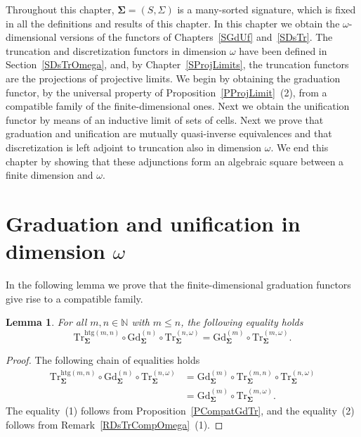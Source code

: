 \documentclass[a4paper, reqno]{amsbook}
\newcommand{\sig}[1]{\mathbf{#1}}             %
\newcommand{\htg}{\mathrm{htg}}                %
\newcommand{\Gd}{\mathrm{Gd}}
\newcommand{\Tr}{\mathrm{Tr}}
\theoremstyle{plain}
\newtheorem{lemma}[theorem]{Lemma}
\theoremstyle{definition}
\begin{document}
Throughout this chapter, $\sig{\Sigma}=(S,\Sigma)$ is a many-sorted signature, which is fixed in all the definitions and results of this chapter.
In this chapter we obtain the $\omega$-dimensional versions of the functors of Chapters~\ref{SGdUf} and~\ref{SDsTr}.
The truncation and discretization functors in dimension $\omega$ have been defined in Section~\ref{SDsTrOmega}, and, by Chapter~\ref{SProjLimits}, the truncation functors are the projections of projective limits.
We begin by obtaining the graduation functor, by the universal property of Proposition~\ref{PProjLimit}~(2), from a compatible family of the finite-dimensional ones.
Next we obtain the unification functor by means of an inductive limit of sets of cells.
Next we prove that graduation and unification are mutually quasi-inverse equivalences and that discretization is left adjoint to truncation also in dimension $\omega$.
We end this chapter by showing that these adjunctions form an algebraic square between a finite dimension and $\omega$.

\section{Graduation and unification in dimension \texorpdfstring{$\omega$}{omega}}\label{SGdUfOmega}

In the following lemma we prove that the finite-dimensional graduation functors give rise to a compatible family.

\begin{lemma}\label{LCompatGdTrOmega}
For all $m,n\in\mathbb{N}$ with $m\leq n$, the following equality holds
$$
\Tr^{\htg(m,n)}_{\sig{\Sigma}}\circ\Gd^{(n)}_{\sig{\Sigma}}\circ \Tr^{(n,\omega)}_{\sig{\Sigma}}=\Gd^{(m)}_{\sig{\Sigma}}\circ \Tr^{(m,\omega)}_{\sig{\Sigma}}.
$$
\end{lemma}
\begin{proof}
The following chain of equalities holds
\begin{align*}
\Tr^{\htg(m,n)}_{\sig{\Sigma}}\circ\Gd^{(n)}_{\sig{\Sigma}}\circ \Tr^{(n,\omega)}_{\sig{\Sigma}}
&=
\Gd^{(m)}_{\sig{\Sigma}}\circ \Tr^{(m,n)}_{\sig{\Sigma}}\circ \Tr^{(n,\omega)}_{\sig{\Sigma}}
\tag{1}
\\&=
\Gd^{(m)}_{\sig{\Sigma}}\circ \Tr^{(m,\omega)}_{\sig{\Sigma}}.
\tag{2}
\end{align*}
The equality~(1) follows from Proposition~\ref{PCompatGdTr}, and the equality~(2) follows from Remark~\ref{RDsTrCompOmega}~(1).
\end{proof}
\end{document}
